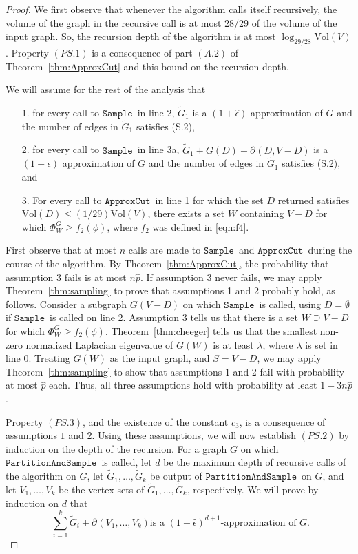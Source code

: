 \documentclass[11pt]{article}
\newcommand{\sample}{\ensuremath{\mathtt{Sample}}}
\newcommand{\approxcut}{\ensuremath{\mathtt{ApproxCut}}}
\newcommand{\partsample}{\ensuremath{\mathtt{PartitionAndSample}}}
\def\Gtil{\widetilde{G}}
\def\phat{\hat{p}}
\def\epshat{\hat{\epsilon}}
\def\bdry#1#2{\partial_{#1}\left(#2\right)}
\def\vol#1{\mathrm{Vol}\left(#1  \right)}
\def\Conducin#1{\Phi^{G}_{#1}}
\begin{document}
\begin{proof}
We first observe that whenever the algorithm calls itself recursively, the volume
  of the graph in the recursive call is at most $28/29$ of the volume of the
  input graph.
So, the recursion depth of the algorithm is at most $\log_{29/28} \vol{V}$.
Property $(PS.1)$ is a consequence of part $(A.2)$ of Theorem~\ref{thm:ApproxCut}
  and this bound on the recursion depth.


We will assume for the rest of the analysis that
\begin{enumerate}
\item [1.] for every call to \sample \ in line 2,
  $\Gtil_{1}$ is a $(1+\epshat )$ approximation of $G$ and the number
  of edges in $\Gtil_{1}$ satisfies (S.2),

\item [2.] for every call to \sample \ in line 3a,
  $\Gtil_{1} + G (D) + \bdry{}{D,V-D}$ is a
  $(1+\epshat )$ approximation of $G$  and the number
  of edges in $\Gtil_{1}$ satisfies (S.2), and
\item [3.] For every call to \approxcut \ in line 1
  for which the set $D$ returned satisfies $\vol{D} \leq (1/29) \vol{V}$,
  there exists a set $W$ containing $V-D$ for which $\Conducin{W} \geq f_{2} (\phi)$,
  where $f_{2}$ was defined in \eqref{eqn:f4}.
\end{enumerate}
First observe that at most $n$ calls are made to \sample \ and \approxcut \
  during the course of the algorithm.
By Theorem~\ref{thm:ApproxCut}, the probability that assumption $3$ fails is at
  most $n \phat $.
If assumption $3$ never fails, 
  we may apply Theorem~\ref{thm:sampling} to prove that assumptions 1 and 2
  probably hold, as follows.
Consider a subgraph $G (V-D)$ on which \sample \ is called, using $D = \emptyset$
  if \sample \ is called on line 2.
Assumption 3 tells us that there is a set $W \supseteq V - D$
  for which $\Conducin{W} \geq f_{2} (\phi)$.
Theorem~\ref{thm:cheeger} tells us that
  the smallest non-zero normalized Laplacian eigenvalue of $G (W)$ is at least
  $\lambda$, where $\lambda$ is set in line $0$.
Treating $G (W)$ as the input graph, and $S = V - D$, 
  we may apply Theorem~\ref{thm:sampling} to show that
  assumptions $1$ and $2$ fail with probability at most $\phat $ each.
Thus, all three assumptions hold with probability at least $1 - 3 n \phat $.

Property $(PS.3)$, and the existence of the constant $c_{3}$,
   is a consequence of assumptions $1$ and $2$.
Using these assumptions, we will now establish $(PS.2)$ by induction on
  the depth of the recursion.
For a graph $G$ on which \partsample \ is called, let $d$ be the maximum
  depth of recursive calls of the algorithm on $G$, let
 $\Gtil_{1}, \dotsc , \Gtil_{k}$ be output of \partsample \ on $G$,
  and let $V_{1}, \dotsc , V_{k}$ be the vertex sets of
  $\Gtil_{1}, \dotsc , \Gtil_{k}$, respectively.
We will prove by induction on $d$ that
\begin{equation}\label{eqn:partsparse}
\text{
 $\sum_{i=1}^{k} \Gtil_{i} + \bdry{}{V_{1}, \dotsc , V_{k}}$
is a $(1+\epshat)^{d+1}$-approximation of $G$.}
\end{equation}




\end{proof}
\end{document}
